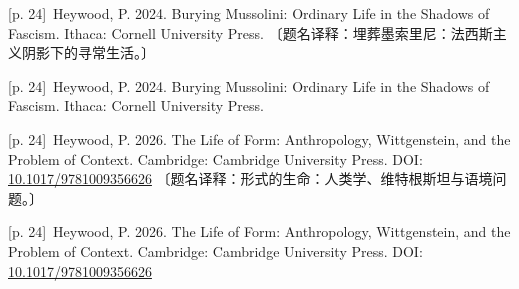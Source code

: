\documentclass[10pt,a4paper]{article}
\begin{document}
\noindent\begin{minipage}{\textwidth}\begin{minipage}[t]{\dimexpr.5\textwidth-4mm\relax}\noindent\begin{minipage}[t]{\linewidth}{\scriptsize\color{gray} [p. 24]}\ Heywood, P. 2024. Burying Mussolini: Ordinary Life in the Shadows of Fascism. Ithaca: Cornell University Press. 〔题名译释：埋葬墨索里尼：法西斯主义阴影下的寻常生活。〕\par\end{minipage}\par\end{minipage}\hfill\begin{minipage}[t]{\dimexpr.5\textwidth-4mm\relax}\noindent\begin{minipage}[t]{\linewidth}{\scriptsize\color{gray} [p. 24]}\ Heywood, P. 2024. Burying Mussolini: Ordinary Life in the Shadows of Fascism. Ithaca: Cornell University Press.\par\end{minipage}\par\end{minipage}\end{minipage}\par
\noindent\begin{minipage}{\textwidth}\begin{minipage}[t]{\dimexpr.5\textwidth-4mm\relax}\noindent\begin{minipage}[t]{\linewidth}{\scriptsize\color{gray} [p. 24]}\ Heywood, P. 2026. The Life of Form: Anthropology, Wittgenstein, and the Problem of Context. Cambridge: Cambridge University Press. DOI: \url{10.1017/9781009356626} 〔题名译释：形式的生命：人类学、维特根斯坦与语境问题。〕\par\end{minipage}\par\end{minipage}\hfill\begin{minipage}[t]{\dimexpr.5\textwidth-4mm\relax}\noindent\begin{minipage}[t]{\linewidth}{\scriptsize\color{gray} [p. 24]}\ Heywood, P. 2026. The Life of Form: Anthropology, Wittgenstein, and the Problem of Context. Cambridge: Cambridge University Press. DOI: \url{10.1017/9781009356626}\par\end{minipage}\par\end{minipage}\end{minipage}\par
\end{document}
